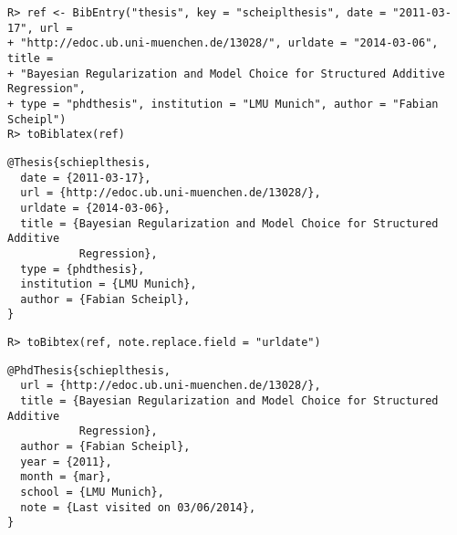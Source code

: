 \documentclass[article]{jss}\usepackage[]{graphicx}\usepackage[]{color}
\makeatletter
\newenvironment{kframe}{%
 \def\at@end@of@kframe{}%
 \ifinner\ifhmode%
  \def\at@end@of@kframe{\end{minipage}}%
  \begin{minipage}{\columnwidth}%
 \fi\fi%
 \def\FrameCommand##1{\hskip\@totalleftmargin \hskip-\fboxsep
 \colorbox{shadecolor}{##1}\hskip-\fboxsep
     \hskip-\linewidth \hskip-\@totalleftmargin \hskip\columnwidth}%
 \MakeFramed {\advance\hsize-\width
   \@totalleftmargin\z@ \linewidth\hsize
   \@setminipage}}%
 {\par\unskip\endMakeFramed%
 \at@end@of@kframe}
\newenvironment{knitrout}{}{} %
\makeatother
\begin{document}
\begin{knitrout}
\color{fgcolor}\begin{kframe}
\begin{verbatim}
R> ref <- BibEntry("thesis", key = "scheiplthesis", date = "2011-03-17", url = 
+ "http://edoc.ub.uni-muenchen.de/13028/", urldate = "2014-03-06", title = 
+ "Bayesian Regularization and Model Choice for Structured Additive Regression", 
+ type = "phdthesis", institution = "LMU Munich", author = "Fabian Scheipl")
R> toBiblatex(ref)
\end{verbatim}
\begin{lstlisting}[showstringspaces=false,style=output,columns=fullflexible,breaklines=true,inputencoding=utf8,extendedchars=	rue,breakautoindent=false,breakindent=0pt,inputencoding=utf8]
@Thesis{schieplthesis,
  date = {2011-03-17},
  url = {http://edoc.ub.uni-muenchen.de/13028/},
  urldate = {2014-03-06},
  title = {Bayesian Regularization and Model Choice for Structured Additive 
           Regression},
  type = {phdthesis},
  institution = {LMU Munich},
  author = {Fabian Scheipl},
}
\end{lstlisting}\begin{verbatim}
R> toBibtex(ref, note.replace.field = "urldate")
\end{verbatim}
\begin{lstlisting}[showstringspaces=false,style=output,columns=fullflexible,breaklines=true,inputencoding=utf8,extendedchars=	rue,breakautoindent=false,breakindent=0pt,inputencoding=utf8]
@PhdThesis{schieplthesis,
  url = {http://edoc.ub.uni-muenchen.de/13028/},
  title = {Bayesian Regularization and Model Choice for Structured Additive 
           Regression},
  author = {Fabian Scheipl},
  year = {2011},
  month = {mar},
  school = {LMU Munich},
  note = {Last visited on 03/06/2014},
}
\end{lstlisting}\end{kframe}
\end{knitrout}
\end{document}
